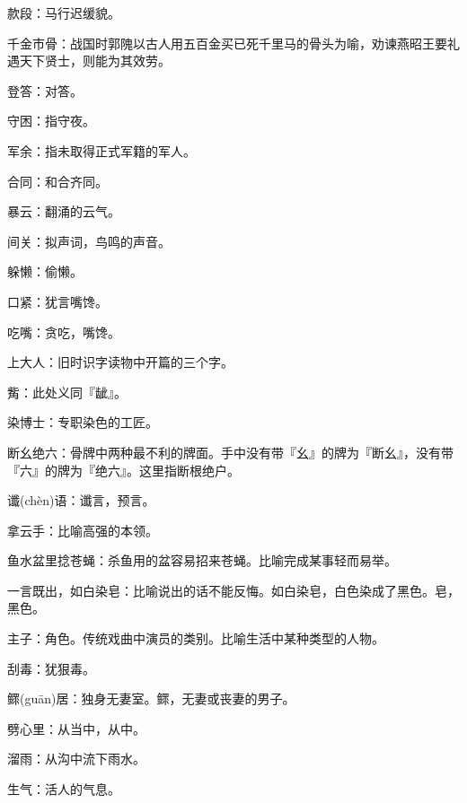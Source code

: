 \startbuffer[2229]
款段：马行迟缓貌。
\stopbuffer


\startbuffer[2230]
千金市骨：战国时郭隗以古人用五百金买已死千里马的骨头为喻，劝谏燕昭王要礼遇天下贤士，则能为其效劳。
\stopbuffer


\startbuffer[2231]
登答：对答。
\stopbuffer


\startbuffer[2232]
守困：指守夜。
\stopbuffer


\startbuffer[2233]
军余：指未取得正式军籍的军人。
\stopbuffer


\startbuffer[2234]
合同：和合齐同。
\stopbuffer


\startbuffer[2235]
暴云：翻涌的云气。
\stopbuffer


\startbuffer[2236]
间关：拟声词，鸟鸣的声音。
\stopbuffer


\startbuffer[2237]
躲懒：偷懒。
\stopbuffer


\startbuffer[2238]
口紧：犹言嘴馋。
\stopbuffer


\startbuffer[2239]
吃嘴：贪吃，嘴馋。
\stopbuffer


\startbuffer[2240]
上大人：旧时识字读物中开篇的三个字。
\stopbuffer


\startbuffer[2241]
觜：此处义同『龇』。
\stopbuffer


\startbuffer[2242]
染博士：专职染色的工匠。
\stopbuffer


\startbuffer[2243]
断幺绝六：骨牌中两种最不利的牌面。手中没有带『幺』的牌为『断幺』，没有带『六』的牌为『绝六』。这里指断根绝户。
\stopbuffer


\startbuffer[2244]
谶(chèn)语：谶言，预言。
\stopbuffer


\startbuffer[2245]
拿云手：比喻高强的本领。
\stopbuffer


\startbuffer[2246]
鱼水盆里捻苍蝇：杀鱼用的盆容易招来苍蝇。比喻完成某事轻而易举。
\stopbuffer


\startbuffer[2247]
一言既出，如白染皂：比喻说出的话不能反悔。如白染皂，白色染成了黑色。皂，黑色。
\stopbuffer


\startbuffer[2248]
主子：角色。传统戏曲中演员的类别。比喻生活中某种类型的人物。
\stopbuffer


\startbuffer[2249]
刮毒：犹狠毒。
\stopbuffer


\startbuffer[2250]
鳏(guān)居：独身无妻室。鳏，无妻或丧妻的男子。
\stopbuffer


\startbuffer[2251]
劈心里：从当中，从中。
\stopbuffer


\startbuffer[2252]
溜雨：从沟中流下雨水。
\stopbuffer


\startbuffer[2253]
生气：活人的气息。
\stopbuffer


